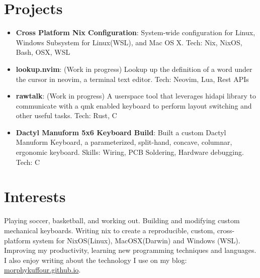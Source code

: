 \documentclass[a4paper,20pt]{article}
\newcommand{\resumeItem}[2]{
  \item\small{
    \textbf{#1}{: #2 \vspace{-2pt}}
  }
}
\newcommand{\resumeSubItem}[2]{\resumeItem{#1}{#2}\vspace{-3pt}}
\newcommand{\resumeSubHeadingListStart}{\begin{itemize}[leftmargin=*]}
\newcommand{\resumeSubHeadingListEnd}{\end{itemize}}
\begin{document}
\section{Projects}
\resumeSubHeadingListStart
\resumeSubItem{Cross Platform Nix Configuration}{System-wide configuration for Linux, Windows Subsystem for Linux(WSL), and Mac OS X.  Tech: Nix, NixOS, Bash, OSX, WSL}
\vspace{2pt}
\resumeSubItem{lookup.nvim}{ (Work in progress) Lookup up the definition of a word under the cursor in neovim, a terminal text editor. Tech: Neovim, Lua, Rest APIs}
\vspace{2pt}
\resumeSubItem{rawtalk}{ (Work in progress) A userspace tool that leverages hidapi library to communicate with a qmk enabled keyboard to perform layout switching and other useful tasks. Tech: Rust, C}
\vspace{2pt}
\resumeSubItem{Dactyl Manuform 5x6 Keyboard Build}{Built a custom Dactyl Manuform Keyboard, a parameterized, split-hand, concave, columnar, ergonomic keyboard. Skills: Wiring, PCB Soldering, Hardware debugging. Tech: C}
\vspace{2pt}
\resumeSubHeadingListEnd
\vspace{-5pt}

\vspace{5pt}
\section{Interests}
Playing soccer, basketball, and working out. Building and modifying custom mechanical keyboards. Writing nix to create a reproducible, custom, cross-platform system for NixOS(Linux), MacOSX(Darwin) and Windows (WSL). Improving my productivity, learning new programming techniques and languages. I also enjoy writing about the technology I use on my blog: \href{https://morphykuffour.github.io/}{morphykuffour.github.io}. \\
\end{document}
